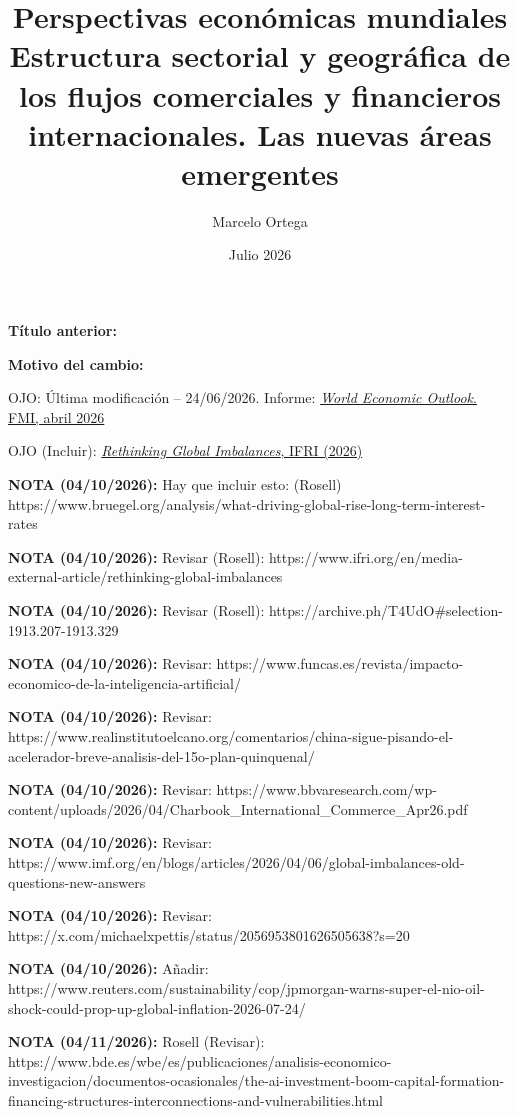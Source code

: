 \documentclass[10pt,a4paper]{article}
\title{Perspectivas económicas mundiales\\
\large Estructura sectorial y geográfica de los flujos comerciales y financieros internacionales. Las nuevas áreas emergentes}
\author{Marcelo Ortega}
\date{Julio 2026}
\newcommand{\puntosclave}[1]{%
  \begin{tcolorbox}[
    colframe=black,
    title={Puntos clave},
    before upper={\setlength{\parindent}{0.5cm}\setlength{\parskip}{0.5\baselineskip}}
  ]
  #1
  \end{tcolorbox}
}
\newcommand{\modificaciones}[1]{
  \begin{tcolorbox}[
    colback=white,
    colframe=red,
    title={Modificaciones a realizar},
    before upper={\setlength{\parindent}{0.5cm}\setlength{\parskip}{0.5\baselineskip}}
  ]
  #1
  \end{tcolorbox}
}
\newcommand{\changebox}{%
\begin{tcolorbox}[title={Historial de cambios del tema}]
\textbf{Título anterior:} \OldTitle\par
\textbf{Motivo del cambio:} \ChangeWhy
\end{tcolorbox}
}
\begin{document}
\maketitle
\changebox

\newpage

\puntosclave{ %
     
    }
\vspace{1cm}

\modificaciones{
    OJO: Última modificación -- 24/06/2026. 
    Informe: \href{https://www.imf.org/-/media/files/publications/weo/2026/april/english/text.pdf}{\textit{World Economic Outlook}. FMI, abril 2026}

    OJO (Incluir): \href{https://www.ifri.org/en/media-external-article/rethinking-global-imbalances}{\textit{Rethinking Global Imbalances}, IFRI (2026)}

    \textbf{NOTA (04/10/2026):} Hay que incluir esto: (Rosell) https://www.bruegel.org/analysis/what-driving-global-rise-long-term-interest-rates

    \textbf{NOTA (04/10/2026):} Revisar (Rosell): https://www.ifri.org/en/media-external-article/rethinking-global-imbalances

    \textbf{NOTA (04/10/2026):} Revisar (Rosell): https://archive.ph/T4UdO\#selection-1913.207-1913.329

    \textbf{NOTA (04/10/2026):} Revisar: https://www.funcas.es/revista/impacto-economico-de-la-inteligencia-artificial/

    \textbf{NOTA (04/10/2026):} Revisar: https://www.realinstitutoelcano.org/comentarios/china-sigue-pisando-el-acelerador-breve-analisis-del-15o-plan-quinquenal/

    \textbf{NOTA (04/10/2026):} Revisar: https://www.bbvaresearch.com/wp-content/uploads/2026/04/Charbook\_International\_Commerce\_Apr26.pdf

    \textbf{NOTA (04/10/2026):} Revisar: https://www.imf.org/en/blogs/articles/2026/04/06/global-imbalances-old-questions-new-answers

    \textbf{NOTA (04/10/2026):} Revisar: https://x.com/michaelxpettis/status/2056953801626505638?s=20

    \textbf{NOTA (04/10/2026):} Añadir: https://www.reuters.com/sustainability/cop/jpmorgan-warns-super-el-nio-oil-shock-could-prop-up-global-inflation-2026-07-24/

    \textbf{NOTA (04/11/2026):} Rosell (Revisar): https://www.bde.es/wbe/es/publicaciones/analisis-economico-investigacion/documentos-ocasionales/the-ai-investment-boom-capital-formation-financing-structures-interconnections-and-vulnerabilities.html

}
\end{document}
